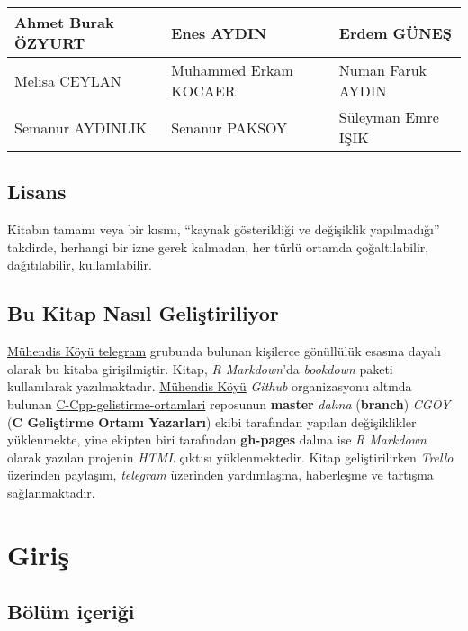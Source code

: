 \documentclass[
]{book}
\begin{document}
\begin{tabular}{l|l|l}
\hline
Ahmet Burak ÖZYURT & Enes AYDIN & Erdem GÜNEŞ\\
\hline
Melisa CEYLAN & Muhammed Erkam KOCAER & Numan Faruk AYDIN\\
\hline
Semanur AYDINLIK & Senanur PAKSOY & Süleyman Emre IŞIK\\
\hline
\end{tabular}

\hypertarget{lisans}{%
\section*{Lisans}\label{lisans}}

Kitabın tamamı veya bir kısmı, ``kaynak gösterildiği ve değişiklik yapılmadığı'' takdirde, herhangi bir izne gerek kalmadan, her türlü ortamda çoğaltılabilir, dağıtılabilir, kullanılabilir.

\hypertarget{bu-kitap-nasux131l-geliux15ftiriliyor}{%
\section*{Bu Kitap Nasıl Geliştiriliyor}\label{bu-kitap-nasux131l-geliux15ftiriliyor}}

\href{https://t.me/koyumuhendis}{Mühendis Köyü telegram} grubunda bulunan kişilerce gönüllülük esasına dayalı olarak bu kitaba girişilmiştir. Kitap, \emph{R Markdown}'da \emph{bookdown} paketi kullanılarak yazılmaktadır. \href{https://github.com/MuhendisKoyu}{Mühendis Köyü} \emph{Github} organizasyonu altında bulunan \href{https://github.com/MuhendisKoyu/C-Cpp-gelistirme-ortamlari}{C-Cpp-gelistirme-ortamlari} reposunun \textbf{master} \emph{dalına} (\textbf{branch}) \emph{CGOY} (\textbf{C Geliştirme Ortamı Yazarları}) ekibi tarafından yapılan değişiklikler yüklenmekte, yine ekipten biri tarafından \textbf{gh-pages} dalına ise \emph{R Markdown} olarak yazılan projenin \emph{HTML} çıktısı yüklenmektedir. Kitap geliştirilirken \emph{Trello} üzerinden paylaşım, \emph{telegram} üzerinden yardımlaşma, haberleşme ve tartışma sağlanmaktadır.

\hypertarget{giriux15f}{%
\chapter*{Giriş}\label{giriux15f}}

\hypertarget{buxf6luxfcm-iuxe7eriux11fi}{%
\section*{Bölüm içeriği}\label{buxf6luxfcm-iuxe7eriux11fi}}
\end{document}
